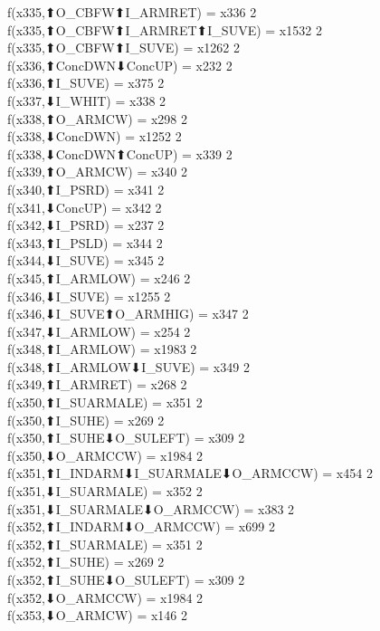 f(x335,⬆O_CBFW⬆I_ARMRET) = x336 {2} \\
f(x335,⬆O_CBFW⬆I_ARMRET⬆I_SUVE) = x1532 {2} \\
f(x335,⬆O_CBFW⬆I_SUVE) = x1262 {2} \\
f(x336,⬆ConcDWN⬇ConcUP) = x232 {2} \\
f(x336,⬆I_SUVE) = x375 {2} \\
f(x337,⬇I_WHIT) = x338 {2} \\
f(x338,⬆O_ARMCW) = x298 {2} \\
f(x338,⬇ConcDWN) = x1252 {2} \\
f(x338,⬇ConcDWN⬆ConcUP) = x339 {2} \\
f(x339,⬆O_ARMCW) = x340 {2} \\
f(x340,⬆I_PSRD) = x341 {2} \\
f(x341,⬇ConcUP) = x342 {2} \\
f(x342,⬇I_PSRD) = x237 {2} \\
f(x343,⬆I_PSLD) = x344 {2} \\
f(x344,⬇I_SUVE) = x345 {2} \\
f(x345,⬆I_ARMLOW) = x246 {2} \\
f(x346,⬇I_SUVE) = x1255 {2} \\
f(x346,⬇I_SUVE⬆O_ARMHIG) = x347 {2} \\
f(x347,⬇I_ARMLOW) = x254 {2} \\
f(x348,⬆I_ARMLOW) = x1983 {2} \\
f(x348,⬆I_ARMLOW⬇I_SUVE) = x349 {2} \\
f(x349,⬆I_ARMRET) = x268 {2} \\
f(x350,⬆I_SUARMALE) = x351 {2} \\
f(x350,⬆I_SUHE) = x269 {2} \\
f(x350,⬆I_SUHE⬇O_SULEFT) = x309 {2} \\
f(x350,⬇O_ARMCCW) = x1984 {2} \\
f(x351,⬆I_INDARM⬇I_SUARMALE⬇O_ARMCCW) = x454 {2} \\
f(x351,⬇I_SUARMALE) = x352 {2} \\
f(x351,⬇I_SUARMALE⬇O_ARMCCW) = x383 {2} \\
f(x352,⬆I_INDARM⬇O_ARMCCW) = x699 {2} \\
f(x352,⬆I_SUARMALE) = x351 {2} \\
f(x352,⬆I_SUHE) = x269 {2} \\
f(x352,⬆I_SUHE⬇O_SULEFT) = x309 {2} \\
f(x352,⬇O_ARMCCW) = x1984 {2} \\
f(x353,⬇O_ARMCW) = x146 {2} \\

